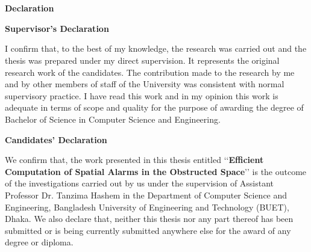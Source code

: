 
\chapter*{}
\vspace{-3cm}
\begin{center}
\vfill

\textbf{\Large {\bf Declaration}}

\vfill
\vfill

{\bf Supervisor's Declaration}
\end{center}
\vfill
\footnotesize{
I confirm that, to the best of my knowledge, the research was carried out and the thesis was prepared under my direct supervision. It represents the original research work of the candidates. The contribution made to the research by me and by other members of staff of the University was consistent with normal supervisory practice. I have read this work and in my opinion this work is adequate in terms of scope and quality for the purpose of awarding the degree of Bachelor of Science in Computer Science and Engineering.
\vfill
\vfill
\vspace{0.6cm}
}
\vspace{1.0cm}
\normalsize
\begin{center}
{\bf Candidates' Declaration}
\end{center}
\vfill
\footnotesize{
We confirm that, the work presented in this thesis entitled \lq\lq{}{\bf Efficient Computation of Spatial Alarms in the Obstructed Space}\rq\rq{} is the outcome of the investigations carried out by us under the supervision of Assistant Professor Dr. Tanzima Hashem in the Department of Computer Science and Engineering, Bangladesh University of Engineering and Technology (BUET), Dhaka. We also declare that, neither this thesis nor any part thereof has been submitted or is being currently submitted anywhere else for the award of any degree or diploma.
\vspace{1.5cm}
}
\normalsize
\vfill
\endinput
